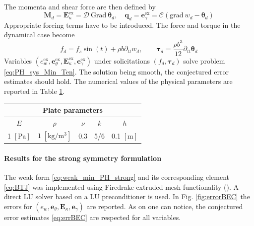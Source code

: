\documentclass{ifacconf}
\begin{document}
The momenta and shear force are then defined by
\[
\bm{M}_d = \bm{E}_\kappa^\text{ex} =  \mathcal{D} \ \mathrm{Grad} \ \bm{\theta}_d, \quad \bm{q}_d = \bm{e}_\gamma^\text{ex} = \mathcal{C}(\mathrm{grad} \ w_d - \bm{\theta}_d)
\]
Appropriate forcing terms have to be introduced. The force and torque in the dynamical case become
\begin{equation*}
f_d = f_s \sin(t) + \rho b \partial_{tt} w_d, \qquad
\bm{\tau}_d = \frac{\rho b^3}{12} \partial_{tt} \bm{\theta}_d
\end{equation*}
Variables $(e_w^\text{ex}, \bm{e}_\theta^\text{ex}, \bm{E}_\kappa^\text{ex}, \bm{e}_\gamma^\text{ex})$ under solicitations $(f_d, \bm{\tau}_d)$ solve problem \eqref{eq:PH_sys_Min_Ten}. The solution being smooth, the conjectured error estimates should hold. The numerical values of the physical parameters are reported in Table \ref{tab:parMin}.

\begin{table}[h]
	\centering
	\begin{tabular}{ccccc}
		\hline 
		\multicolumn{5}{c}{Plate parameters} \\ 
		\hline 
		$E$ & $\rho$ & $\nu$ & $k$ & $h$ \\
		1 $[\textrm{Pa}]$ & $1\; [\textrm{kg}/\textrm{m}^3]$ & 0.3 & 5/6 & 0.1 $[\textrm{m}]$\\ 
		\hline 
	\end{tabular} 
	\captionsetup{width=0.95\linewidth}
	\vspace{1mm}
	\label{tab:parMin}
\end{table}

\paragraph{Results for the strong symmetry formulation} 

The weak form \eqref{eq:weak_min_PH_strong} and its corresponding element \eqref{eq:BTJ} was implemented using Firedrake extruded mesh functionality (\cite{firedrake_extruded}). A direct LU solver based on a LU preconditioner is used. In Fig. \ref{fig:errorBEC} the errors for $(e_w, \bm{e}_\theta, \bm{E}_\kappa, \bm{e}_\gamma)$ are reported. As on one can notice, the conjectured error estimates \eqref{eq:errBEC} are respected for all variables. 
\end{document}
